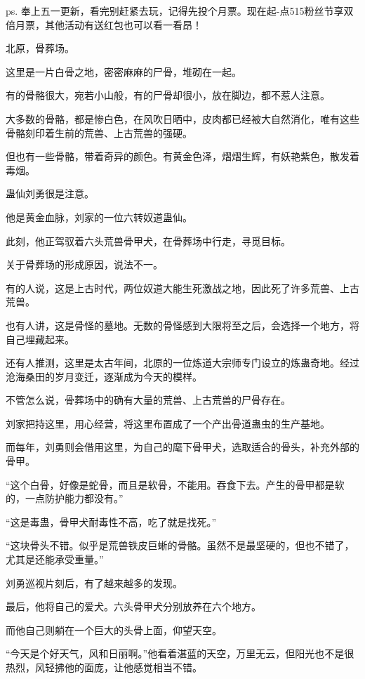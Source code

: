 
\begin{this_body}

ps. 奉上五一更新，看完别赶紧去玩，记得先投个月票。现在起-点515粉丝节享双倍月票，其他活动有送红包也可以看一看昂！

北原，骨葬场。

这里是一片白骨之地，密密麻麻的尸骨，堆砌在一起。

有的骨骼很大，宛若小山般，有的尸骨却很小，放在脚边，都不惹人注意。

大多数的骨骼，都是惨白色，在风吹日晒中，皮肉都已经被大自然消化，唯有这些骨骼刻印着生前的荒兽、上古荒兽的强硬。

但也有一些骨骼，带着奇异的颜色。有黄金色泽，熠熠生辉，有妖艳紫色，散发着毒烟。

蛊仙刘勇很是注意。

他是黄金血脉，刘家的一位六转奴道蛊仙。

此刻，他正驾驭着六头荒兽骨甲犬，在骨葬场中行走，寻觅目标。

关于骨葬场的形成原因，说法不一。

有的人说，这是上古时代，两位奴道大能生死激战之地，因此死了许多荒兽、上古荒兽。

也有人讲，这是骨怪的墓地。无数的骨怪感到大限将至之后，会选择一个地方，将自己埋藏起来。

还有人推测，这里是太古年间，北原的一位炼道大宗师专门设立的炼蛊奇地。经过沧海桑田的岁月变迁，逐渐成为今天的模样。

不管怎么说，骨葬场中的确有大量的荒兽、上古荒兽的尸骨存在。

刘家把持这里，用心经营，将这里布置成了一个产出骨道蛊虫的生产基地。

而每年，刘勇则会借用这里，为自己的麾下骨甲犬，选取适合的骨头，补充外部的骨甲。

“这个白骨，好像是蛇骨，而且是软骨，不能用。吞食下去。产生的骨甲都是软的，一点防护能力都没有。”

“这是毒蛊，骨甲犬耐毒性不高，吃了就是找死。”

“这块骨头不错。似乎是荒兽铁皮巨蜥的骨骼。虽然不是最坚硬的，但也不错了，尤其是还能承受重量。”

刘勇巡视片刻后，有了越来越多的发现。

最后，他将自己的爱犬。六头骨甲犬分别放养在六个地方。

而他自己则躺在一个巨大的头骨上面，仰望天空。

“今天是个好天气，风和日丽啊。”他看着湛蓝的天空，万里无云，但阳光也不是很热烈，风轻拂他的面庞，让他感觉相当不错。


\end{this_body}

